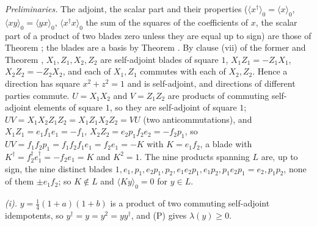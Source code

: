 \emph{Preliminaries.} The adjoint, the scalar part and their properties ($\langle x^{\dagger}\rangle_{0} = \langle x\rangle_{0}$, $\langle xy\rangle_{0} = \langle yx\rangle_{0}$, $\langle x^{\dagger}x\rangle_{0}$ the sum of the squares of the coefficients of $x$, the scalar part of a product of two blades zero unless they are equal up to sign) are those of Theorem ; the blades are a basis by Theorem . By clause (vii) of the former and Theorem , $X_{1}, Z_{1}, X_{2}, Z_{2}$ are self-adjoint blades of square $1$, $X_{1}Z_{1} = -Z_{1}X_{1}$, $X_{2}Z_{2} = -Z_{2}X_{2}$, and each of $X_{1}, Z_{1}$ commutes with each of $X_{2}, Z_{2}$. Hence a direction has square $x^{2} + z^{2} = 1$ and is self-adjoint, and directions of different parties commute. $U = X_{1}X_{2}$ and $V = Z_{1}Z_{2}$ are products of commuting self-adjoint elements of square $1$, so they are self-adjoint of square $1$; $UV = X_{1}X_{2}Z_{1}Z_{2} = X_{1}Z_{1}X_{2}Z_{2} = VU$ (two anticommutations), and $X_{1}Z_{1} = e_{1}f_{1}e_{1} = -f_{1}$, $X_{2}Z_{2} = e_{2}p_{1}f_{2}e_{2} = -f_{2}p_{1}$, so $UV = f_{1}f_{2}p_{1} = f_{1}f_{2}f_{1}e_{1} = f_{2}e_{1} = -K$ with $K = e_{1}f_{2}$, a blade with $K^{\dagger} = f_{2}^{\dagger}e_{1}^{\dagger} = -f_{2}e_{1} = K$ and $K^{2} = 1$. The nine products spanning $L$ are, up to sign, the nine distinct blades $1, e_{1}, p_{1}, e_{2}p_{1}, p_{2}, e_{1}e_{2}p_{1}, e_{1}p_{2}, p_{1}e_{2}p_{1} = e_{2}, p_{1}p_{2}$, none of them $\pm e_{1}f_{2}$; so $K \notin L$ and $\langle Ky\rangle_{0} = 0$ for $y \in L$.

\emph{(i).} $y = \tfrac14(1 + a)(1 + b)$ is a product of two commuting self-adjoint idempotents, so $y^{\dagger} = y = y^{2} = yy^{\dagger}$, and (P) gives $\lambda(y) \ge 0$.

